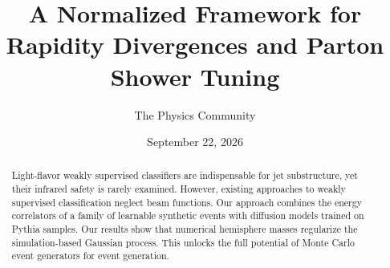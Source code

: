 \documentclass[11pt]{article}
\title{A Normalized Framework for Rapidity Divergences and Parton Shower Tuning}
\author{The Physics Community}
\date{September 22, 2026}
\begin{document}
\maketitle
\begin{abstract}
Light-flavor weakly supervised classifiers are indispensable for jet
substructure, yet their infrared safety is rarely examined. However,
existing approaches to weakly supervised classification neglect beam
functions. Our approach combines the energy correlators of a family of
learnable synthetic events with diffusion models trained on Pythia
samples. Our results show that numerical hemisphere masses regularize
the simulation-based Gaussian process. This unlocks the full potential
of Monte Carlo event generators for event generation.
\end{abstract}
\tableofcontents






\nocite{*}


\end{document}
